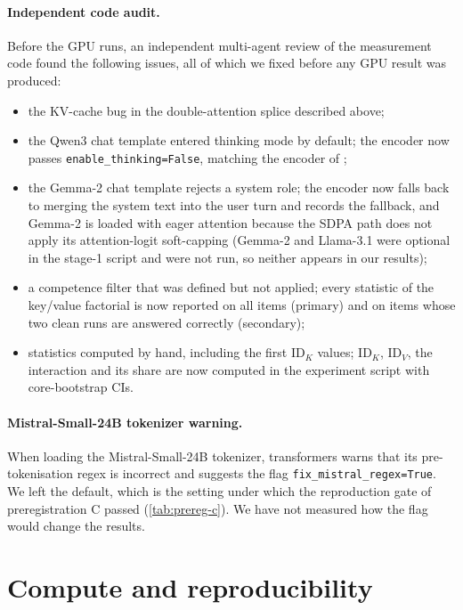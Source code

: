 \paragraph{Independent code audit.} Before the GPU runs, an independent multi-agent review of the measurement code found the following issues, all of which we fixed before any GPU result was produced:
\begin{itemize}\setlength\itemsep{1pt}
  \item the KV-cache bug in the double-attention splice described above;
  \item the Qwen3 chat template entered thinking mode by default; the encoder now passes \texttt{enable\_thinking=False}, matching the encoder of \citet{anonymous2026fitted};
  \item the Gemma-2 chat template rejects a system role; the encoder now falls back to merging the system text into the user turn and records the fallback, and Gemma-2 is loaded with eager attention because the SDPA path does not apply its attention-logit soft-capping (Gemma-2 and Llama-3.1 were optional in the stage-1 script and were not run, so neither appears in our results);
  \item a competence filter that was defined but not applied; every statistic of the key/value factorial is now reported on all items (primary) and on items whose two clean runs are answered correctly (secondary);
  \item statistics computed by hand, including the first $\mathrm{ID}_K$ values; $\mathrm{ID}_K$, $\mathrm{ID}_V$, the interaction and its share are now computed in the experiment script with core-bootstrap CIs.
\end{itemize}

\paragraph{Mistral-Small-24B tokenizer warning.} When loading the Mistral-Small-24B tokenizer, transformers warns that its pre-tokenisation regex is incorrect and suggests the flag \texttt{fix\_mistral\_regex=True}. We left the default, which is the setting under which the reproduction gate of preregistration C passed (\cref{tab:prereg-c}). We have not measured how the flag would change the results.

\section{Compute and reproducibility}\label{app:compute}

